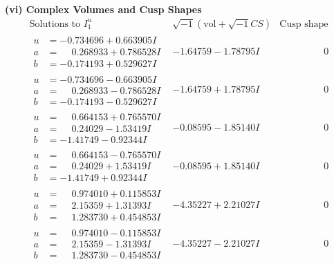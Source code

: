 \documentclass[1p]{elsarticle_modified}
\theoremstyle{definition}
\newcommand{\I}{\sqrt{-1}}
\begin{document}
\newpage\flushleft \textbf{(vi) Complex Volumes and Cusp Shapes}
$$\begin{array}{c|c|c}  
\text{Solutions to }I^u_{1}& \I (\text{vol} + \sqrt{-1}CS) & \text{Cusp shape}\\
 \hline 
\begin{aligned}
u &= -0.734696 + 0.663905 I \\
a &= \phantom{-}0.268933 + 0.786528 I \\
b &= -0.174193 + 0.529627 I\end{aligned}
 & -1.64759 - 1.78795 I & \phantom{-0.000000 } 0 \\ \hline\begin{aligned}
u &= -0.734696 - 0.663905 I \\
a &= \phantom{-}0.268933 - 0.786528 I \\
b &= -0.174193 - 0.529627 I\end{aligned}
 & -1.64759 + 1.78795 I & \phantom{-0.000000 } 0 \\ \hline\begin{aligned}
u &= \phantom{-}0.664153 + 0.765570 I \\
a &= \phantom{-}0.24029 - 1.53419 I \\
b &= -1.41749 - 0.92344 I\end{aligned}
 & -0.08595 - 1.85140 I & \phantom{-0.000000 } 0 \\ \hline\begin{aligned}
u &= \phantom{-}0.664153 - 0.765570 I \\
a &= \phantom{-}0.24029 + 1.53419 I \\
b &= -1.41749 + 0.92344 I\end{aligned}
 & -0.08595 + 1.85140 I & \phantom{-0.000000 } 0 \\ \hline\begin{aligned}
u &= \phantom{-}0.974010 + 0.115853 I \\
a &= \phantom{-}2.15359 + 1.31393 I \\
b &= \phantom{-}1.283730 + 0.454853 I\end{aligned}
 & -4.35227 + 2.21027 I & \phantom{-0.000000 } 0 \\ \hline\begin{aligned}
u &= \phantom{-}0.974010 - 0.115853 I \\
a &= \phantom{-}2.15359 - 1.31393 I \\
b &= \phantom{-}1.283730 - 0.454853 I\end{aligned}
 & -4.35227 - 2.21027 I & \phantom{-0.000000 } 0 \\ \hline\begin{aligned}

\end{aligned}
\end{array}$$
\end{document}
